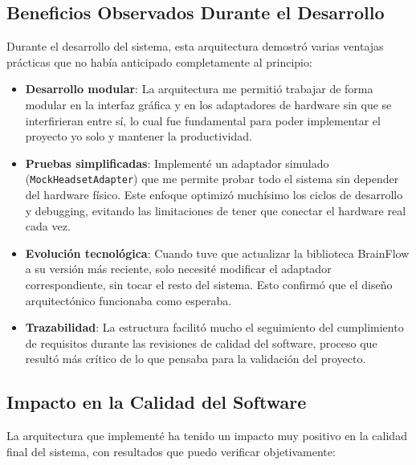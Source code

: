 \newpage
\subsection{Beneficios Observados Durante el Desarrollo}

Durante el desarrollo del sistema, esta arquitectura demostró varias ventajas prácticas que no había anticipado completamente al principio:

\begin{itemize}
    \item \textbf{Desarrollo modular}: La arquitectura me permitió trabajar de forma modular en la interfaz gráfica y en los adaptadores de hardware sin que se interfirieran entre sí, lo cual fue fundamental para poder implementar el proyecto yo solo y mantener la productividad.
    
    \item \textbf{Pruebas simplificadas}: Implementé un adaptador simulado (\texttt{MockHeadsetAdapter}) que me permite probar todo el sistema sin depender del hardware físico. Este enfoque optimizó muchísimo los ciclos de desarrollo y debugging, evitando las limitaciones de tener que conectar el hardware real cada vez.
    
    \item \textbf{Evolución tecnológica}: Cuando tuve que actualizar la biblioteca BrainFlow a su versión más reciente, solo necesité modificar el adaptador correspondiente, sin tocar el resto del sistema. Esto confirmó que el diseño arquitectónico funcionaba como esperaba.
    
    \item \textbf{Trazabilidad}: La estructura facilitó mucho el seguimiento del cumplimiento de requisitos durante las revisiones de calidad del software, proceso que resultó más crítico de lo que pensaba para la validación del proyecto.
\end{itemize}

\subsection{Impacto en la Calidad del Software}

La arquitectura que implementé ha tenido un impacto muy positivo en la calidad final del sistema, con resultados que puedo verificar objetivamente:

